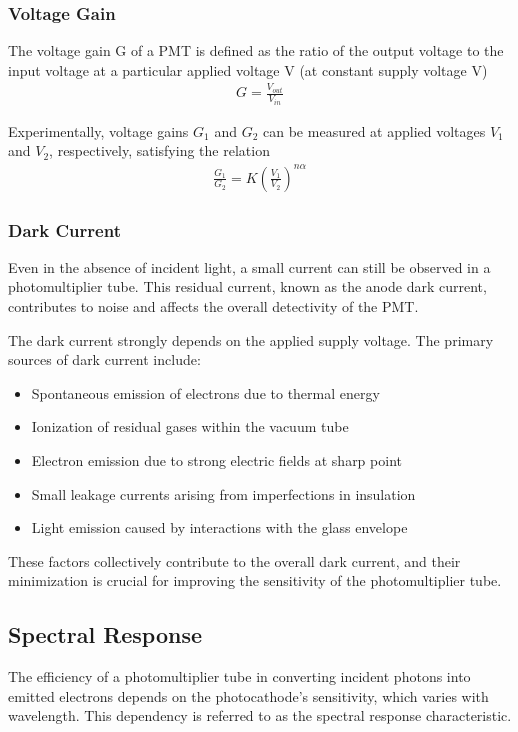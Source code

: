 \subsubsection{Voltage Gain}
The voltage gain G of a PMT is defined as the ratio of the output voltage to the input voltage at a particular applied voltage V (at constant supply voltage V) \begin{align}G = \frac{V_{out}}{V_{in}}\end{align}

Experimentally, voltage gains $G_1$ and $G_2$ can be measured at applied voltages $V_1$ and $V_2$, respectively, satisfying the relation
\begin{align}\frac{G_1}{G_2} = K\left(\frac{V_1}{V_2}\right)^{n\alpha}\end{align}

\subsubsection{Dark Current}
Even in the absence of incident light, a small current can still be observed in a photomultiplier tube. This residual current, known as the anode dark current, contributes to noise and affects the overall detectivity of the PMT.

The dark current strongly depends on the applied supply voltage. The primary sources of dark current include:

\begin{itemize}
    \item Spontaneous emission of electrons due to thermal energy
    \item Ionization of residual gases within the vacuum tube
    \item Electron emission due to strong electric fields at sharp point
    \item Small leakage currents arising from imperfections in insulation
    \item Light emission caused by interactions with the glass envelope
\end{itemize}
These factors collectively contribute to the overall dark current, and their minimization is crucial for improving the sensitivity of the photomultiplier tube.

\subsection{Spectral Response}

The efficiency of a photomultiplier tube in converting incident photons into emitted electrons depends on the photocathode’s sensitivity, which varies with wavelength. This dependency is referred to as the spectral response characteristic. 

